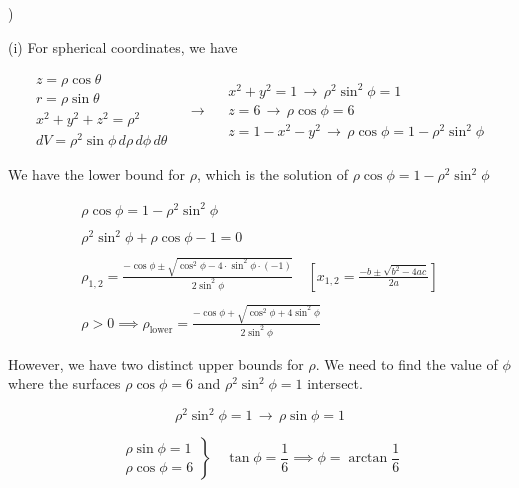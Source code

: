 \documentclass{article}
\begin{document}
\hfill

)

\hfill

\noindent (i) For spherical coordinates, we have

\[
\begin{array}{c}
z=\rho\cos\theta\\
r=\rho\sin\theta\\
x^2+y^2+z^2=\rho^2\\
dV=\rho^2\sin\phi\,d\rho\,d\phi\,d\theta
\end{array}\quad\rightarrow\quad
\begin{array}{c}
x^2+y^2=1\,\rightarrow\,\rho^2\sin^2\phi = 1\\
z=6\,\rightarrow\,\rho\cos\phi=6\\
z=1-x^2-y^2\,\rightarrow\,\rho\cos\phi=1-\rho^2\sin^2\phi
\end{array}
\]

\hfill

\noindent We have the lower bound for $\rho$, which is the solution of $\rho\cos\phi=1-\rho^2\sin^2\phi$

\[
\begin{array}{c}
\rho\cos\phi=1-\rho^2\sin^2\phi\\\\
\rho^2\sin^2\phi+\rho\cos\phi-1=0\\\\
\displaystyle \rho_{1,2} = \frac{-\cos\phi \pm\sqrt{\cos^2\phi-4\cdot\sin^2\phi\cdot(-1)}}{2\sin^2\phi}\quad\left[x_{1,2}=\frac{-b\pm\sqrt{b^2-4ac}}{2a}\right]\\\\
\displaystyle \rho>0\implies\rho_{\text{lower}}=\frac{-\cos\phi +\sqrt{\cos^2\phi+4\sin^2\phi}}{2\sin^2\phi}
\end{array}
\]

\hfill

\noindent However, we have two distinct upper bounds for $\rho$. We need to find the value of $\phi$ where the surfaces $\rho\cos\phi = 6$ and $\rho^2\sin^2\phi=1$ intersect.

\begin{equation*}
\rho^2\sin^2\phi=1 \,\rightarrow\,\rho\sin\phi = 1
\end{equation*}

\[
\left.
\begin{array}{c}
\rho\sin\phi=1\\
\rho\cos\phi=6
\end{array}
\right\}\quad\tan\phi=\frac16\implies\phi=\arctan{\frac16}
\]
\end{document}
